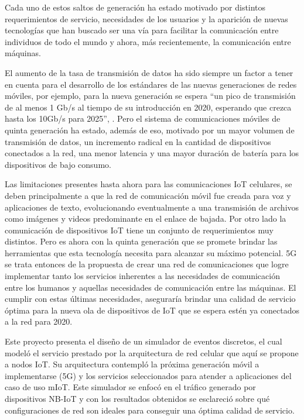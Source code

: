 \newline

Cada uno de estos saltos de generación ha estado motivado por distintos requerimientos de servicio, necesidades de los usuarios y la aparición de nuevas tecnologías que han buscado ser una vía para facilitar la comunicación entre individuos de todo el mundo y ahora, más recientemente, la comunicación entre máquinas.\newline

El aumento de la tasa de transmisión de datos ha sido siempre un factor a tener en cuenta para el desarrollo de los estándares de las nuevas generaciones de redes móviles, por ejemplo, para la nueva generación se espera “un pico de transmisión de al menos 1 Gb/s al tiempo de su introducción en 2020, esperando que crezca hasta los 10Gb/s para 2025”, \parencite{Fettweis2016}. Pero el sistema de comunicaciones móviles de quinta generación ha estado, además de eso, motivado por un mayor volumen de transmisión de datos, un incremento radical en la cantidad de dispositivos conectados a la red, una menor latencia y una mayor duración de batería para los dispositivos de bajo consumo.\newline

Las limitaciones presentes hasta ahora para las comunicaciones IoT celulares, se deben principalmente a que la red de comunicación móvil fue creada para voz y aplicaciones de texto, evolucionando eventualmente a una transmisión de archivos como imágenes y videos predominante en el enlace de bajada. Por otro lado la comunicación de dispositivos IoT tiene un conjunto de requerimientos muy distintos. Pero es ahora con la quinta generación que se promete brindar las herramientas que esta tecnología necesita para alcanzar su máximo potencial. 5G se trata entonces de la propuesta de crear una red de comunicaciones que logre implementar tanto los servicios inherentes a las necesidades de comunicación entre los humanos y aquellas necesidades de comunicación entre las máquinas. El cumplir con estas últimas necesidades, aseguraría brindar una calidad de servicio óptima para la nueva ola de dispositivos de IoT que se espera estén ya conectados a la red para 2020.\newline

Este proyecto presenta el diseño de un simulador de eventos discretos, el cual modeló el servicio prestado por la arquitectura de red celular que aquí se propone a nodos IoT. Su arquitectura contempló la próxima generación móvil a implementarse (5G) y los servicios seleccionados para atender a aplicaciones del caso de uso mIoT. Este simulador se enfocó en el tráfico generado por dispositivos NB-IoT y con los resultados obtenidos se esclareció sobre qué configuraciones de red son ideales para conseguir una óptima calidad de servicio.\newline


